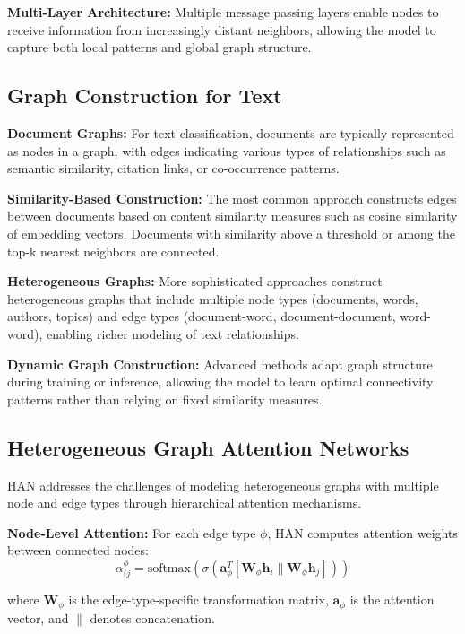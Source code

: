 \textbf{Multi-Layer Architecture:} Multiple message passing layers enable nodes to receive information from increasingly distant neighbors, allowing the model to capture both local patterns and global graph structure.

\subsection{Graph Construction for Text}

\textbf{Document Graphs:} For text classification, documents are typically represented as nodes in a graph, with edges indicating various types of relationships such as semantic similarity, citation links, or co-occurrence patterns.

\textbf{Similarity-Based Construction:} The most common approach constructs edges between documents based on content similarity measures such as cosine similarity of embedding vectors. Documents with similarity above a threshold or among the top-k nearest neighbors are connected.

\textbf{Heterogeneous Graphs:} More sophisticated approaches construct heterogeneous graphs that include multiple node types (documents, words, authors, topics) and edge types (document-word, document-document, word-word), enabling richer modeling of text relationships.

\textbf{Dynamic Graph Construction:} Advanced methods adapt graph structure during training or inference, allowing the model to learn optimal connectivity patterns rather than relying on fixed similarity measures.

\subsection{Heterogeneous Graph Attention Networks}

HAN addresses the challenges of modeling heterogeneous graphs with multiple node and edge types through hierarchical attention mechanisms.

\textbf{Node-Level Attention:} For each edge type $\phi$, HAN computes attention weights between connected nodes:
\begin{equation}
\alpha_{ij}^{\phi} = \text{softmax}\left(\sigma\left(\mathbf{a}_{\phi}^T [\mathbf{W}_{\phi} \mathbf{h}_i \| \mathbf{W}_{\phi} \mathbf{h}_j]\right)\right)
\end{equation}

where $\mathbf{W}_{\phi}$ is the edge-type-specific transformation matrix, $\mathbf{a}_{\phi}$ is the attention vector, and $\|$ denotes concatenation.

